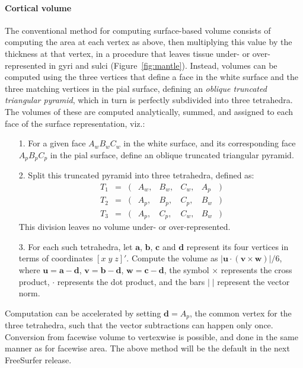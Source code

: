 \paragraph{Cortical volume}

The conventional method for computing surface-based volume consists of computing the area at each vertex as above, then multiplying this value by the thickness at that vertex, in a procedure that leaves tissue under- or over-represented in gyri and sulci (Figure~\ref{fig:mantle}). Instead, volumes can be computed using the three vertices that define a face in the white surface and the three matching vertices in the pial surface, defining an \emph{oblique truncated triangular pyramid}, which in turn is perfectly subdivided into three tetrahedra. The volumes of these are computed analytically, summed, and assigned to each face of the surface representation, viz.:

\begin{itemize}[leftmargin=*]
\item[1.] For a given face $A_w B_w C_w$ in the white surface, and its corresponding face $A_p B_p C_p$ in the pial surface, define an oblique truncated triangular pyramid.
\item[2.] Split this truncated pyramid into three tetrahedra, defined as:
$$
\begin{array}{lcllllll}
T_1 &=& (&A_w,&B_w,&C_w,&A_p&)\\
T_2 &=& (&A_p,&B_p,&C_p,&B_w&)\\
T_3 &=& (&A_p,&C_p,&C_w,&B_w&)
\end{array}$$
This division leaves no volume under- or over-represented.
\item[3.] For each such tetrahedra, let $\mathbf{a}$, $\mathbf{b}$, $\mathbf{c}$ and $\mathbf{d}$ represent its four vertices in terms of coordinates $[x\;y\;z]'$. Compute the volume as $|\mathbf{u}\cdot(\mathbf{v} \times \mathbf{w})|/6$, where $\mathbf{u} = \mathbf{a}-\mathbf{d}$, $\mathbf{v} = \mathbf{b}-\mathbf{d}$, $\mathbf{w} = \mathbf{c}-\mathbf{d}$, the symbol $\times$ represents the cross product, $\cdot$ represents the dot product, and the bars $|\;|$ represent the vector norm.
\end{itemize}

\noindent
Computation can be accelerated by setting $\mathbf{d}=A_p$, the common vertex for the three tetrahedra, such that the vector subtractions can happen only once. Conversion from facewise volume to vertexwise is possible, and done in the same manner as for facewise area. The above method will be the default in the next FreeSurfer release.

